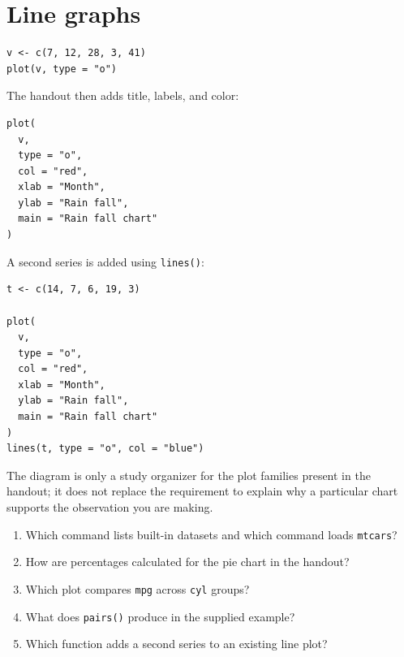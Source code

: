 \section{Line graphs}

\begin{lstlisting}[style=dsr]
v <- c(7, 12, 28, 3, 41)
plot(v, type = "o")
\end{lstlisting}

The handout then adds title, labels, and color:

\begin{lstlisting}[style=dsr]
plot(
  v,
  type = "o",
  col = "red",
  xlab = "Month",
  ylab = "Rain fall",
  main = "Rain fall chart"
)
\end{lstlisting}

A second series is added using \texttt{lines()}:

\begin{lstlisting}[style=dsr]
t <- c(14, 7, 6, 19, 3)

plot(
  v,
  type = "o",
  col = "red",
  xlab = "Month",
  ylab = "Rain fall",
  main = "Rain fall chart"
)
lines(t, type = "o", col = "blue")
\end{lstlisting}

\begin{dsfigure}
\end{dsfigure}

The diagram is only a study organizer for the plot families present in the handout; it does not replace the requirement to explain why a particular chart supports the observation you are making.

\begin{quickcheck}
\begin{enumerate}
  \item Which command lists built-in datasets and which command loads \texttt{mtcars}?
  \item How are percentages calculated for the pie chart in the handout?
  \item Which plot compares \texttt{mpg} across \texttt{cyl} groups?
  \item What does \texttt{pairs()} produce in the supplied example?
  \item Which function adds a second series to an existing line plot?
\end{enumerate}
\end{quickcheck}

